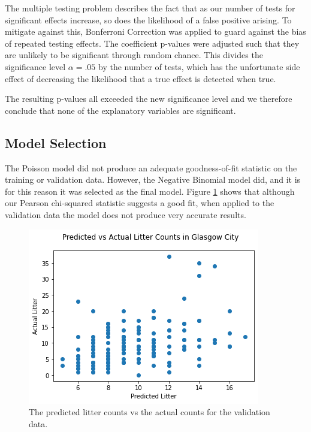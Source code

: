 \documentclass{thesis}
\begin{document}
The multiple testing problem describes the fact that as our number of tests for significant effects increase, so does the likelihood of a false positive arising. To mitigate against this, Bonferroni Correction was applied to guard against the bias of repeated testing effects. The coefficient p-values were adjusted such that they are unlikely to be significant through random chance. This divides the significance level $\alpha = .05$ by the number of tests, which has the unfortunate side effect of decreasing the likelihood that a true effect is detected when true.

The resulting p-values all exceeded the new significance level and we therefore conclude that none of the explanatory variables are significant.

\subsection{Model Selection}

The Poisson model did not produce an adequate goodness-of-fit statistic on the training or validation data. However, the Negative Binomial model did, and it is for this reason it was selected as the final model. Figure \ref{fig:predicted-vs-actual-valid} shows that although our Pearson chi-squared statistic suggests a good fit, when applied to the validation data the model does not produce very accurate results.

\begin{figure}[h]
    \centering
    \includegraphics[scale=0.75]{images/valid-predicted-vs-actual-nb.png}
    \caption{The predicted litter counts vs the actual counts for the validation data.}
    \label{fig:predicted-vs-actual-valid}
\end{figure}

\end{document}
